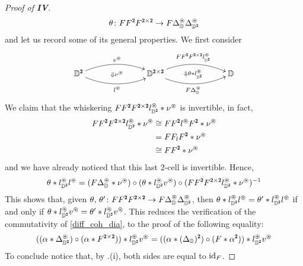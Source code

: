 \begin{proof}[Proof of \athm\textbf{IV}]
\[
\theta\colon FF^\due F^{\due\times \due}\to F\Delta_\D^\circledast \Delta^\circledast_{\D^\due}
\]
and let us record some of its general properties. We first consider 
\[
\xymatrix@C=2.5cm{
	\D^\due 
	\ar@/^1pc/[r]^{v^\circledast}
	\ar@/_1pc/[r]_{l^\circledast}
	\ar@{}[r]|{\Downarrow\nu^\circledast}
	& \D^{\due\times\due} 
	\ar@/^1pc/[r]^{FF^\due F^{\due\times\due} l_{\D^\due}^{\circledast}}
	\ar@/_1pc/[r]_{F\Delta^\circledast_\D}
	\ar@{}[r]|{\Downarrow\theta *l^{\circledast}_{\D^\due}}
	& \D
}
\]
We claim that the whiskering $FF^\due F^{\due\times\due} l^\circledast_{\D^\due} * \nu^{\circledast}$ is invertible, in fact,
\begin{align*}
FF^\due F^{\due\times\due} l^\circledast_{\D^\due}  * \nu^\circledast &\cong FF^\due l^\circledast  F^\due * \nu^\circledast\\
&= FF_lF^\due * \nu^\circledast \\
&\cong  FF^\due * \nu^\circledast
\end{align*}
and we have already noticed that this last 2-cell is invertible. Hence,
\[
\theta *l^{\circledast}_{\D^\due}l^\circledast=(F\Delta^\circledast_\D*\nu^\circledast)\circ (\theta *l^{\circledast}_{\D^\due}v^{\circledast})\circ(FF^\due F^{\due\times\due} l_{\D^\due}^{\circledast}*\nu^\circledast)^{-1}
\]
This shows that, given $\theta,\, \theta'\colon FF^\due F^{\due\times \due}\to F\Delta_\D^\circledast \Delta^\circledast_{\D^\due}$, then $\theta *l^{\circledast}_{\D^\due}l^\circledast=\theta' *l^{\circledast}_{\D^\due}l^\circledast$ if and only if $\theta *l^{\circledast}_{\D^\due}v^{\circledast}=\theta' *l^{\circledast}_{\D^\due}v^{\circledast}$. This reduces the verification of the commutativity of \eqref{diff_coh_dia}, to the proof of the following equality:
\[
((\alpha * \Delta_{\D^\due}^\circledast)\circ (\alpha * F^{\due\times\due})) *l^{\circledast}_{\D^\due}v^{\circledast}=((\alpha * (\Delta_\D)^\due)\circ (F * \alpha^\due))*l^{\circledast}_{\D^\due}v^{\circledast}
\]
To conclude notice that, by .(i), both sides are equal to $\operatorname{id}_{F}$.
\end{proof}


